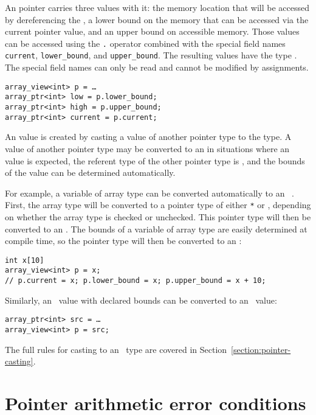 An \arrayviewT
pointer carries three values with it: the memory location that will be
accessed by dereferencing the
\arrayviewT, a lower
bound on the memory that can be accessed via the current pointer value,
and an upper bound on accessible memory. Those values can be accessed
using the \texttt{.} operator combined with the special field names
\texttt{current}, \texttt{lower\_bound}, and \texttt{upper\_bound}. The
resulting values have the type
\arrayptrT . The
special field names can only be read and cannot be modified by
assignments.

\begin{verbatim}
array_view<int> p = …
array_ptr<int> low = p.lower_bound;
array_ptr<int> high = p.upper_bound;
array_ptr<int> current = p.current;
\end{verbatim}

An \arrayviewT value
is created by casting a value of another pointer type to the
\arrayviewT type. A
value of another pointer type may be converted to an
\arrayviewT in
situations where an
\arrayviewT value is
expected, the referent type of the other pointer type is , and
the bounds of the value can be determined automatically.

For example, a variable of array type can be converted automatically to
an \arrayview\ . First, the array type will be converted to a
pointer type of either  \texttt{*} or
\arrayptrT , depending
on whether the array type is checked or unchecked. This pointer type
will then be converted to an
\arrayviewT. The
bounds of a variable of array type are easily determined at compile
time, so the pointer type will then be converted to an
\arrayviewT:

\begin{verbatim}
int x[10]
array_view<int> p = x; 
// p.current = x; p.lower_bound = x; p.upper_bound = x + 10;

\end{verbatim}

Similarly, an \arrayptr\ value with declared bounds can be
converted to an \arrayview\ value:

\begin{verbatim}
array_ptr<int> src = …
array_view<int> p = src;
\end{verbatim}

The full rules for casting to an \arrayview\ type are covered
in Section~\ref{section:pointer-casting}.

\section{Pointer arithmetic error conditions}


